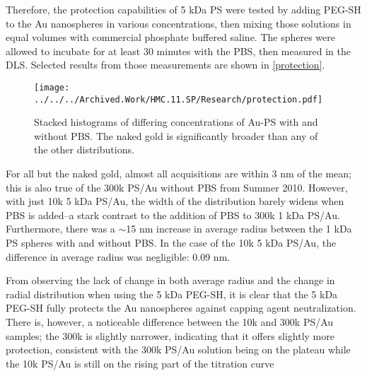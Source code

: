 Therefore, the protection capabilities of 5 kDa PS were tested by adding PEG-SH to the Au nanospheres in various concentrations, then mixing those solutions in equal volumes with commercial phosphate buffered saline. The spheres were allowed to incubate for at least 30 minutes with the PBS, then measured in the DLS. Selected results from those measurements are shown in \autoref{protection}.

\begin{figure}[htbp]
\centering
\texttt{[image: ../../../Archived.Work/HMC.11.SP/Research/protection.pdf]}
\caption{Stacked histograms of differing concentrations of Au-PS with and without PBS. The naked gold is significantly broader than any of the other distributions.}
\label{protection}
\end{figure}



For all but the naked gold, almost all acquisitions are within 3 nm of the mean; this is also true of the 300k PS\slash Au without PBS from Summer 2010. However, with just 10k 5 kDa PS\slash Au, the width of the distribution barely widens when PBS is added--a stark contrast to the addition of PBS to 300k 1 kDa PS\slash Au. Furthermore, there was a \ensuremath{\sim}15 nm increase in average radius between the 1 kDa PS spheres with and without PBS. In the case of the 10k 5 kDa PS\slash Au, the difference in average radius was negligible: 0.09 nm.

From observing the lack of change in both average radius and the change in radial distribution when using the 5 kDa PEG-SH, it is clear that the 5 kDa PEG-SH fully protects the Au nanospheres against capping agent neutralization. There is, however, a noticeable difference between the 10k and 300k PS\slash Au samples; the 300k is slightly narrower, indicating that it offers slightly more protection, consistent with the 300k PS\slash Au solution being on the plateau while the 10k PS\slash Au is still on the rising part of the titration curve
